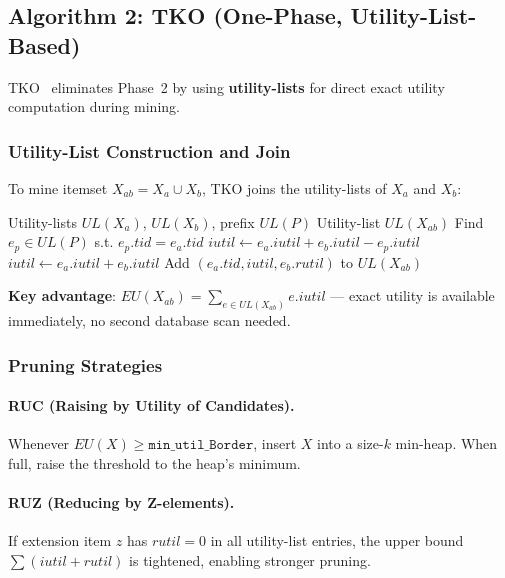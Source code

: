 \subsection{Algorithm 2: TKO (One-Phase, Utility-List-Based)}
\label{sec:tko}

TKO~\cite{ref_tku_paper} eliminates Phase~2 by using \textbf{utility-lists} for direct exact utility computation during mining.

\subsubsection{Utility-List Construction and Join}

To mine itemset $X_{ab} = X_a \cup X_b$, TKO joins the utility-lists of $X_a$ and $X_b$:

\begin{algorithm}[H]
\caption{Utility-List Join for TKO}
\label{alg:ul_join}
\begin{algorithmic}[1]
\Require Utility-lists $UL(X_a)$, $UL(X_b)$, prefix $UL(P)$
\Ensure Utility-list $UL(X_{ab})$
            \State Find $e_p \in UL(P)$ s.t. $e_p.tid = e_a.tid$
            \State $iutil \leftarrow e_a.iutil + e_b.iutil - e_p.iutil$
        \Else
            \State $iutil \leftarrow e_a.iutil + e_b.iutil$
        \EndIf
        \State Add $(e_a.tid, iutil, e_b.rutil)$ to $UL(X_{ab})$
    \EndIf
\EndFor
\end{algorithmic}
\end{algorithm}

\textbf{Key advantage}: $EU(X_{ab}) = \sum_{e \in UL(X_{ab})} e.iutil$ --- exact utility is available immediately, no second database scan needed.

\subsubsection{Pruning Strategies}

\paragraph{RUC (Raising by Utility of Candidates).}
Whenever $EU(X) \geq \texttt{min\_util\_Border}$, insert $X$ into a size-$k$ min-heap. When full, raise the threshold to the heap's minimum.

\paragraph{RUZ (Reducing by Z-elements).}
If extension item $z$ has $rutil = 0$ in all utility-list entries, the upper bound $\sum(iutil + rutil)$ is tightened, enabling stronger pruning.

